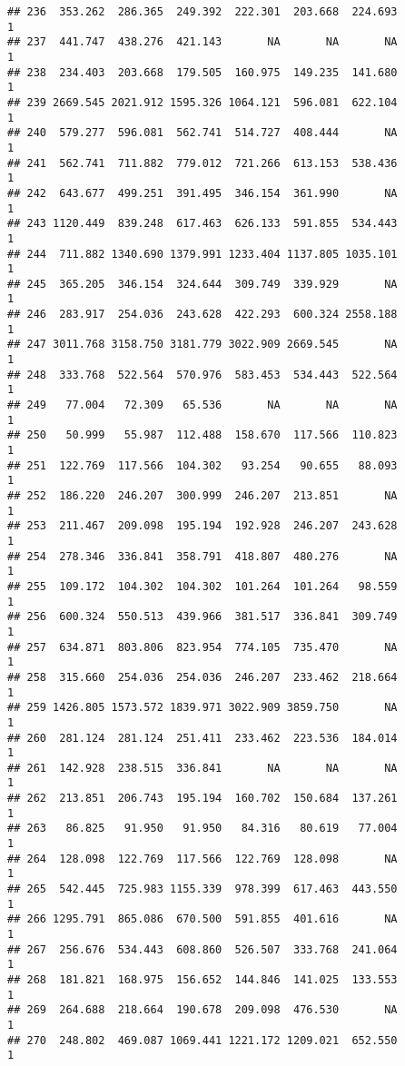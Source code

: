 \documentclass[
]{article}
\begin{document}
\begin{verbatim}
## 236  353.262  286.365  249.392  222.301  203.668  224.693             1
## 237  441.747  438.276  421.143       NA       NA       NA             1
## 238  234.403  203.668  179.505  160.975  149.235  141.680             1
## 239 2669.545 2021.912 1595.326 1064.121  596.081  622.104             1
## 240  579.277  596.081  562.741  514.727  408.444       NA             1
## 241  562.741  711.882  779.012  721.266  613.153  538.436             1
## 242  643.677  499.251  391.495  346.154  361.990       NA             1
## 243 1120.449  839.248  617.463  626.133  591.855  534.443             1
## 244  711.882 1340.690 1379.991 1233.404 1137.805 1035.101             1
## 245  365.205  346.154  324.644  309.749  339.929       NA             1
## 246  283.917  254.036  243.628  422.293  600.324 2558.188             1
## 247 3011.768 3158.750 3181.779 3022.909 2669.545       NA             1
## 248  333.768  522.564  570.976  583.453  534.443  522.564             1
## 249   77.004   72.309   65.536       NA       NA       NA             1
## 250   50.999   55.987  112.488  158.670  117.566  110.823             1
## 251  122.769  117.566  104.302   93.254   90.655   88.093             1
## 252  186.220  246.207  300.999  246.207  213.851       NA             1
## 253  211.467  209.098  195.194  192.928  246.207  243.628             1
## 254  278.346  336.841  358.791  418.807  480.276       NA             1
## 255  109.172  104.302  104.302  101.264  101.264   98.559             1
## 256  600.324  550.513  439.966  381.517  336.841  309.749             1
## 257  634.871  803.806  823.954  774.105  735.470       NA             1
## 258  315.660  254.036  254.036  246.207  233.462  218.664             1
## 259 1426.805 1573.572 1839.971 3022.909 3859.750       NA             1
## 260  281.124  281.124  251.411  233.462  223.536  184.014             1
## 261  142.928  238.515  336.841       NA       NA       NA             1
## 262  213.851  206.743  195.194  160.702  150.684  137.261             1
## 263   86.825   91.950   91.950   84.316   80.619   77.004             1
## 264  128.098  122.769  117.566  122.769  128.098       NA             1
## 265  542.445  725.983 1155.339  978.399  617.463  443.550             1
## 266 1295.791  865.086  670.500  591.855  401.616       NA             1
## 267  256.676  534.443  608.860  526.507  333.768  241.064             1
## 268  181.821  168.975  156.652  144.846  141.025  133.553             1
## 269  264.688  218.664  190.678  209.098  476.530       NA             1
## 270  248.802  469.087 1069.441 1221.172 1209.021  652.550             1

\end{verbatim}
\end{document}
